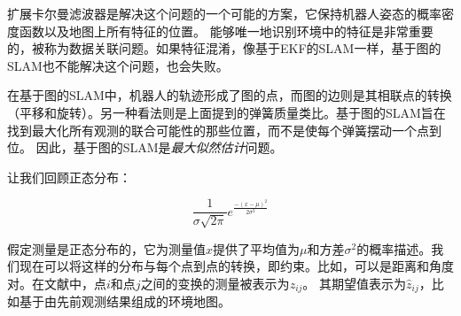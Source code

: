 扩展卡尔曼滤波器是解决这个问题的一个可能的方案，它保持机器人姿态的概率密度函数以及地图上所有特征的位置。 能够唯一地识别环境中的特征是非常重要的，被称为数据关联问题。如果特征混淆，像基于EKF的SLAM一样，基于图的SLAM也不能解决这个问题，也会失败。


在基于图的SLAM中，机器人的轨迹形成了图的点，而图的边则是其相联点的转换（平移和旋转）。另一种看法则是上面提到的弹簧质量类比。基于图的SLAM旨在找到最大化所有观测的联合可能性的那些位置，而不是使每个弹簧摆动一个点到位。 因此，基于图的SLAM是\emph{最大似然估计}问题。


让我们回顾正态分布：

\begin{equation}
\frac{1}{\sigma\sqrt{2\pi}}e^{\frac{-(x-\mu)^2}{2\sigma^2}}
\end{equation}


假定测量是正态分布的，它为测量值$ x $提供了平均值为$\mu$和方差$ \sigma^2 $的概率描述。我们现在可以将这样的分布与每个点到点的转换，即约束。比如，可以是距离和角度对。在文献中，点$i$和点$j$之间的变换的测量被表示为$ z_{ij} $。 其期望值表示为$ \hat{z}_{ij} $，比如基于由先前观测结果组成的环境地图。


